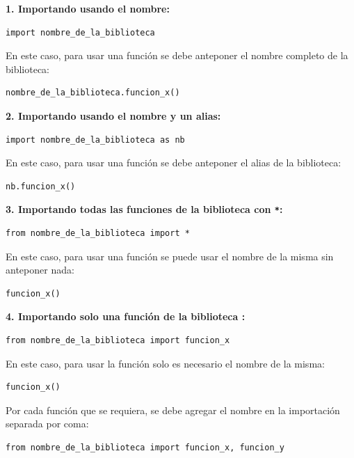 \documentclass[
  spanish,
  letterpaper,
]{scrbook}
\theoremstyle{definition}
\theoremstyle{remark}
\begin{document}
\textbf{1. Importando usando el nombre:}

\begin{verbatim}
import nombre_de_la_biblioteca
\end{verbatim}

En este caso, para usar una función se debe anteponer el nombre completo
de la biblioteca:

\begin{verbatim}
nombre_de_la_biblioteca.funcion_x()
\end{verbatim}

\textbf{2. Importando usando el nombre y un alias:}

\begin{verbatim}
import nombre_de_la_biblioteca as nb
\end{verbatim}

En este caso, para usar una función se debe anteponer el alias de la
biblioteca:

\begin{verbatim}
nb.funcion_x()
\end{verbatim}

\textbf{3. Importando todas las funciones de la biblioteca con
\texttt{*}:}

\begin{verbatim}
from nombre_de_la_biblioteca import *
\end{verbatim}

En este caso, para usar una función se puede usar el nombre de la misma
sin anteponer nada:

\begin{verbatim}
funcion_x()
\end{verbatim}

\textbf{4. Importando solo una función de la biblioteca :}

\begin{verbatim}
from nombre_de_la_biblioteca import funcion_x
\end{verbatim}

En este caso, para usar la función solo es necesario el nombre de la
misma:

\begin{verbatim}
funcion_x()
\end{verbatim}

Por cada función que se requiera, se debe agregar el nombre en la
importación separada por coma:

\begin{verbatim}
from nombre_de_la_biblioteca import funcion_x, funcion_y
\end{verbatim}
\end{document}
